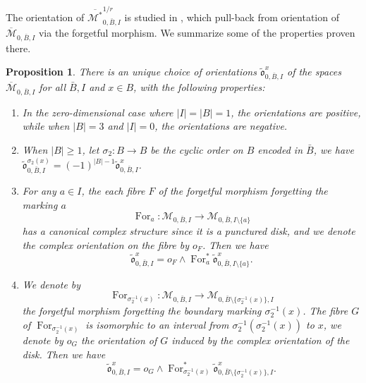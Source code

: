 \documentclass[11pt,a4paper]{article}
\newtheorem{prop}[dummy]{Proposition}
\theoremstyle{definition}
\theoremstyle{remark}
\numberwithin{equation}{section}
\def\Mbar{{\overline{\mathcal M}}}
\def\Mbarstar{{\overline{\mathcal M^*}}}
\begin{document}
The orientation of $\Mbarstar^{1/r}_{0,\bar{B},I}$ is studied in \cite[Section 3.3]{BCT1}, which pull-back from orientation of $\Mbar_{0,\bar{B},I}$ via the forgetful morphism. We summarize some of the properties proven there.
\begin{prop}\label{prop:orientation moduli}
    There is an unique choice of orientations $\tilde{\mathfrak o}^{x}_{0,\bar{B},I}$ of the spaces $\Mbar_{0,\bar{B},I}$ for all $\bar{B},I$ and $x\in B$, with the following properties:
    \begin{enumerate}
        \item In the zero-dimensional case where $\vert I \vert = \vert B \vert = 1$, the orientations are positive, while when $\vert B \vert = 3$ and $\vert I \vert = 0$, the orientations are negative.
        \item When $\lvert B\rvert\ge 1$, let $\sigma_2\colon B \to B$ be the cyclic order on $B$ encoded in $\bar B$, we have $\tilde{\mathfrak o}^{\sigma_2(x)}_{0,\bar{B},I}=(-1)^{\vert B \vert-1}\tilde{\mathfrak o}^{x}_{0,\bar{B},I}$.

          

         \item \label{item genus zero moduli orientation forget internal marking}
        For any $a \in I$, the each fibre $F$ of the forgetful morphism forgetting the marking $a$
        $$
        \operatorname{For}_a\colon \mathcal M_{0,\bar{B},I} \to \mathcal M_{0,\bar{B},I\setminus\{a\}}
        $$
        has a canonical complex structure since it is a punctured disk, and we denote the complex orientation on the fibre by $o_F$. Then we have $$\tilde{\mathfrak o}^{x}_{0,\bar{B},I}=o_F\wedge \operatorname{For}_a^*\tilde{\mathfrak o}^{x}_{0,
        \bar{B},I\setminus\{a\}}.$$ 
        
        \item \label{item genus zero orientation moduli forget boundary marking}
        We denote by
         $$
        \operatorname{For}_{\sigma_2^{-1}(x)}\colon \mathcal M_{0,\bar{B},I} \to \mathcal M_{0,\bar{B}\setminus\{\sigma_2^{-1}(x)\},I}
        $$
        the forgetful morphism forgetting the boundary marking $\sigma_2^{-1}(x)$. The fibre $G$ of $\operatorname{For}_{\sigma_2^{-1}(x)}$ is isomorphic to an interval from $\sigma_2^{-1}(\sigma_2^{-1}(x))$ to $x$, we denote by $o_G$ the orientation of $G$ induced by the complex orientation of the disk. Then we have
        $$\tilde{\mathfrak o}^{x}_{0,\bar{B},I}=o_G\wedge \operatorname{For}_{\sigma_2^{-1}(x)}^*\tilde{\mathfrak o}^{x}_{0,\bar{B}\setminus\{\sigma_2^{-1}(x)\},I}.$$ 


\end{enumerate}
\end{prop}
\end{document}
